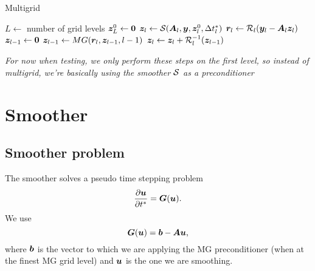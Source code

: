 \documentclass{article}
\begin{document}
\begin{algorithm}
    \caption{Multigrid}\label{alg:multigrid}
    \begin{algorithmic}[l]
        \State $L \gets $ number of grid levels
        \State  $\bm{z}_L^0 \gets \bm{0}$ 
         
            \State $ \bm{z}_l \gets \mathcal{S}(\bm{A}_l, \bm{y}, \bm{z}_l^0, \Delta t^*_l) $
                \State $ \bm{r}_l \gets \mathcal{R}_l (\bm{y}_l - \bm{A}_l\bm{z}_l ) $
                \State $ \bm{z}_{l-1} \gets \bm{0} $ 
                   
                    \State $ \bm{z}_{l-1} \gets MG(\bm{r}_l, \bm{z}_{l-1}, l - 1) $ 
                \EndFor
                \State $ \bm{z}_l \gets \bm{z}_l + \mathcal{R}^{-1}_l(\bm{z}_{l-1}) $ 
            \EndIf
        \EndProcedure
    \end{algorithmic}
\end{algorithm}

\emph{For now when testing, we only perform these steps on the first level, so instead of multigrid, we're basically using the smoother $\mathcal{S}$ as a preconditioner}

\section{Smoother}\label{sec:smoother}

\subsection{Smoother problem}

The smoother solves a pseudo time stepping problem 
\begin{equation}\label{eq:smoother_pseudo_time_step}
    \dfrac{\partial\bm{u}}{\partial t^*} = \bm{G}(\bm{u})
    \text{.}
\end{equation}
We use
\begin{equation}
    \bm{G}(\bm{u}) = \bm{b} - \bm{A}\bm{u}
    \text{,}
\end{equation}
where $\bm{b}$ is the vector to which we are applying the MG preconditioner (when at the finest MG grid level) and $\bm{u}$ is the one we are smoothing.
\end{document}
